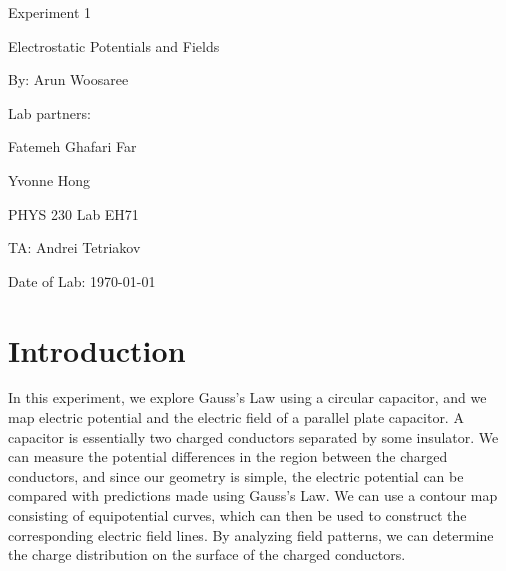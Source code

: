 \documentclass[letterpaper]{article}
\begin{document}
  \begin{titlepage}
    \begin{center}
        \vspace*{1cm}
        \Huge
        Experiment 1
        \vspace{1cm}

        Electrostatic Potentials and Fields
        \vspace{1cm}

        By: Arun Woosaree
        \vspace{1cm}

        Lab partners:
        \vspace{.25cm}
        \Large

        Fatemeh Ghafari Far

        Yvonne Hong
        \vspace{1cm}

        \Huge
        PHYS 230 Lab EH71
        \vspace{1cm}

        TA: Andrei Tetriakov
        \vspace{1cm}

        Date of Lab: \today
        \vfill
    \end{center}
\end{titlepage}

\section{Introduction}

In this experiment, we explore Gauss's Law using a circular capacitor, and
we map electric potential and the electric field of a parallel plate capacitor.
A capacitor is essentially two charged conductors separated by some insulator.
We can measure the potential differences in the region between the charged conductors,
and since our geometry is simple, the electric potential can be compared with
predictions made using Gauss's Law. We can use a contour map consisting of equipotential
curves, which can then be used to construct the corresponding electric field lines.
By analyzing field patterns, we can determine the charge distribution on the surface of
the charged conductors.
\end{document}
